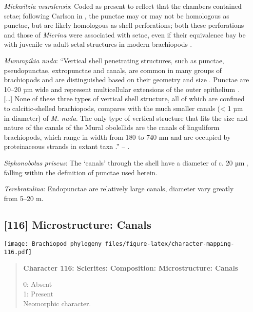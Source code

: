 \documentclass[openany]{book}
\theoremstyle{definition}
\theoremstyle{definition}
\theoremstyle{definition}
\theoremstyle{remark}
\begin{document}
\hypertarget{Mickwitzia_muralensis-coding-115}{}
\emph{Mickwitzia muralensis}: Coded as present to reflect that the
chambers contained setae; following Carlson in
\citet{Williams2007Supplement}, the punctae may or may not be homologous
as punctae, but are likely homologous as shell perforations; both these
perforations and those of \emph{Micrina} were associated with setae,
even if their equivalence bay be with juvenile vs adult setal structures
in modern brachiopods \citep[p.~397]{Balthasar2004Shellstructure}.

\hypertarget{Mummpikia_nuda-coding-115}{}
\emph{Mummpikia nuda}: ``Vertical shell penetrating structures, such as
punctae, pseudopunctae, extropunctae and canals, are common in many
groups of brachiopods and are distinguished based on their geometry and
size \citep{Williams1997Introduction}. Punctae are 10--20 µm wide and
represent multicellular extensions of the outer epithelium
\citep{Owen1969Thecaecum}. {[}\ldots{}{]} None of these three types of
vertical shell structure, all of which are confined to calcitic-shelled
brachiopods, compares with the much smaller canals (\textless{} 1 µm in
diameter) of \emph{M. nuda}. The only type of vertical structure that
fits the size and nature of the canals of the Mural obolellids are the
canals of linguliform brachiopods, which range in width from 180 to 740
nm and are occupied by proteinaceous strands in extant taxa
\citetext{\citealp[1994]{Williams1992Structureof}; \citealp{Williams1997Introduction}}.''
-- \citet{Balthasar2008iMummpikia}.

\hypertarget{Siphonobolus_priscus-coding-115}{}
\emph{Siphonobolus priscus}: The `canals' through the shell have a
diameter of c. 20 µm \citep[text-fig. 2a]{Williams2004Chemicostructure},
falling within the definition of punctae used herein.

\hypertarget{Terebratulina-coding-115}{}
\emph{Terebratulina}: Endopunctae are relatively large canals, diameter
vary greatly from 5--20 m.

\subsection*{{[}116{]} Microstructure:
Canals}\label{microstructure-canals}

\texttt{[image: Brachiopod\_phylogeny\_files/figure-latex/character-mapping-116.pdf]}

\begin{quote}
\textbf{Character 116: Sclerites: Composition: Microstructure: Canals}

0: Absent\\
1: Present\\
Neomorphic character.
\end{quote}
\end{document}
